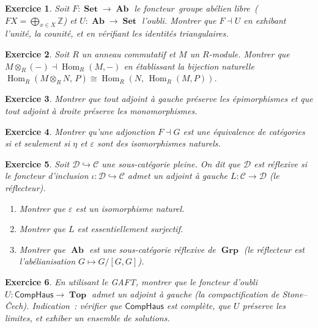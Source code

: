 \documentclass[a4paper,12pt]{book}
\DeclareMathOperator{\Hom}{Hom}
\DeclareMathOperator{\Set}{\mathbf{Set}}
\DeclareMathOperator{\Grp}{\mathbf{Grp}}
\DeclareMathOperator{\Ab}{\mathbf{Ab}}
\DeclareMathOperator{\Top}{\mathbf{Top}}
\newcommand{\Z}{\mathbb{Z}}
\newtheorem{exercice}{Exercice}[chapter]
\providecommand{\og}{\guillemotleft\,}
\providecommand{\fg}{\,\guillemotright}
\begin{document}
\begin{exercice}\label{exo:adj-libre-ab}
Soit $F\colon\Set\to\Ab$ le foncteur \og{}groupe abélien libre\fg{}
($FX = \bigoplus_{x\in X}\Z$) et $U\colon\Ab\to\Set$ l'oubli.
Montrer que $F\dashv U$ en exhibant l'unité, la counité,
et en vérifiant les identités triangulaires.
\end{exercice}

\begin{exercice}\label{exo:adj-tensor-hom}
Soit $R$ un anneau commutatif et $M$ un $R$-module.
Montrer que $M\otimes_R(-)\dashv\Hom_R(M,-)$ en établissant
la bijection naturelle
$\Hom_R(M\otimes_R N,\,P)\cong\Hom_R(N,\,\Hom_R(M,P))$.
\end{exercice}

\begin{exercice}\label{exo:adj-preserve-epi}
Montrer que tout adjoint à gauche préserve les épimorphismes
et que tout adjoint à droite préserve les monomorphismes.
\end{exercice}

\begin{exercice}\label{exo:adj-equivalence}
Montrer qu'une adjonction $F\dashv G$ est une équivalence de catégories
si et seulement si $\eta$ et $\varepsilon$ sont des isomorphismes naturels.
\end{exercice}

\begin{exercice}\label{exo:adj-reflexive}
Soit $\mathcal{D}\hookrightarrow\mathcal{C}$ une sous-catégorie pleine.
On dit que $\mathcal{D}$ est \emph{réflexive} si le foncteur d'inclusion
$\iota\colon\mathcal{D}\hookrightarrow\mathcal{C}$ admet un adjoint à gauche
$L\colon\mathcal{C}\to\mathcal{D}$ (le \emph{réflecteur}).
\begin{enumerate}[label=(\alph*)]
\item Montrer que $\varepsilon$ est un isomorphisme naturel.
\item Montrer que $L$ est essentiellement surjectif.
\item Montrer que $\Ab$ est une sous-catégorie réflexive de $\Grp$
      (le réflecteur est l'abélianisation $G\mapsto G/[G,G]$).
\end{enumerate}
\end{exercice}

\begin{exercice}\label{exo:gaft-application}
En utilisant le GAFT, montrer que le foncteur d'oubli
$U\colon\mathsf{CompHaus}\to\Top$ admet un adjoint à gauche
(la compactification de Stone--Čech).
\emph{Indication}~: vérifier que $\mathsf{CompHaus}$ est complète,
que $U$ préserve les limites, et exhiber un ensemble de solutions.
\end{exercice}
\end{document}
